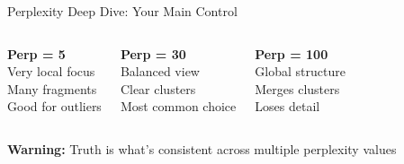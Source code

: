 \documentclass[aspectratio=169]{beamer}
\newcommand{\warning}[1]{\colorbox{red!10}{\textcolor{warningcolor}{\textbf{Warning:} #1}}}
\begin{document}
\begin{frame}{Perplexity Deep Dive: Your Main Control}
\vspace{0.3cm}
\begin{columns}
\textbf{Perp = 5}\\
Very local focus\\
Many fragments\\
Good for outliers

\textbf{Perp = 30}\\
Balanced view\\
Clear clusters\\
Most common choice

\textbf{Perp = 100}\\
Global structure\\
Merges clusters\\
Loses detail
\end{columns}

\vspace{0.2cm}
\warning{Truth is what's consistent across multiple perplexity values}
\end{frame}
\end{document}
